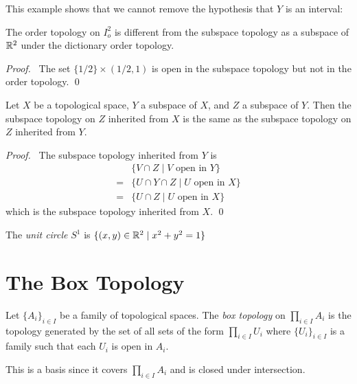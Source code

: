 This example shows that we cannot remove the hypothesis that $Y$ is an interval:

\begin{example}
    The order topology on $I_o^2$ is different from the subspace topology as a subspace of $\mathbb{R}^2$ under
    the dictionary order topology.
\end{example}

\begin{proof}
    \pf\ The set $\{ 1/2 \} \times (1/2, 1)$ is open in the subspace topology but not in the order topology.
    \qed
\end{proof}

\begin{proposition}
    Let $X$ be a topological space, $Y$ a subspace of $X$, and $Z$ a subspace of $Y$. Then the subspace
    topology on $Z$ inherited from $X$ is the same as the subspace topology on $Z$ inherited from $Y$.
\end{proposition}

\begin{proof}
    \pf\ The subspace topology inherited from $Y$ is
    \begin{align*}
        & \{ V \cap Z \mid V \text{ open in } Y \} \\
        = & \{ U \cap Y \cap Z \mid U \text{ open in } X \} \\
        = & \{ U \cap Z \mid U \text{ open in } X \}
    \end{align*}
    which is the subspace topology inherited from $X$. \qed
\end{proof}

\begin{definition}
    The \emph{unit circle} $S^1$ is $\{ (x,y) \in \mathbb{R}^2 \mid x^2 + y^2 = 1 \}$
\end{definition}


\section{The Box Topology}

\begin{definition}
    Let $\{ A_i \}_{i \in I}$ be a family of topological spaces. The \emph{box topology} on $\prod_{i \in I} A_i$ is the topology generated by the set of all sets
    of the form $\prod_{i \in I} U_i$ where $\{ U_i \}_{i \in I}$ is a family such that each $U_i$ is open in $A_i$.
\end{definition}

This is a basis since it covers $\prod_{i \in I} A_i$ and is closed under intersection.

